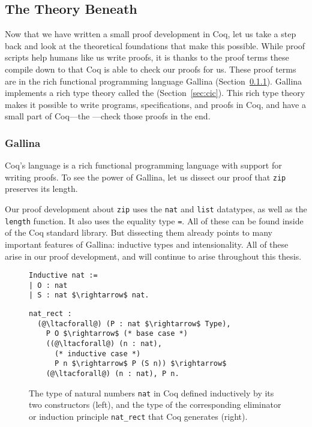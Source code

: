 \subsection{The Theory Beneath}
\label{sec:mot-theory}

Now that we have written a small proof development in Coq, let us take a step back and look at the theoretical foundations that make this possible.
While proof scripts help humans like us write proofs, it is thanks to the proof terms these compile down to that Coq is able to check our proofs for us.
These proof terms are in the rich functional programming language Gallina (Section~\ref{sec:gallina}).
Gallina implements a rich type theory called the  (Section~\ref{sec:cic}).
This rich type theory makes it possible to write programs, specifications, and proofs in Coq,
and have a small part of Coq---the ---check those proofs in the end.

\subsubsection{Gallina}
\label{sec:gallina}

Coq's  language  is a rich functional programming language with support for writing proofs.
To see the power of Gallina, let us dissect our proof that \lstinline{zip} preserves its length.

Our proof development about \lstinline{zip} uses the \lstinline{nat} and \lstinline{list} datatypes,
as well as the \lstinline{length} function.
It also uses the equality type \lstinline{=}.
All of these can be found inside of the Coq standard library.
But dissecting them already points to many important features of Gallina:
inductive types and intensionality.
All of these arise in our proof development, and will continue to arise throughout this thesis.

\begin{figure}
\begin{minipage}{0.30\textwidth}
\begin{lstlisting}
Inductive nat :=
| O : nat
| S : nat $\rightarrow$ nat.
\end{lstlisting}
\end{minipage}
\hfill
\begin{minipage}{0.68\textwidth}
\begin{lstlisting}
nat_rect :
  (@\ltacforall@) (P : nat $\rightarrow$ Type),
    P O $\rightarrow$ (* base case *)
    ((@\ltacforall@) (n : nat),
      (* inductive case *)
      P n $\rightarrow$ P (S n)) $\rightarrow$
    (@\ltacforall@) (n : nat), P n.
\end{lstlisting}
\end{minipage}
\caption{The type of natural numbers \lstinline{nat} in Coq defined inductively by its two constructors (left), and the type of the corresponding eliminator or induction principle \lstinline{nat_rect} that Coq generates (right).}
\label{fig:nat}
\end{figure}

